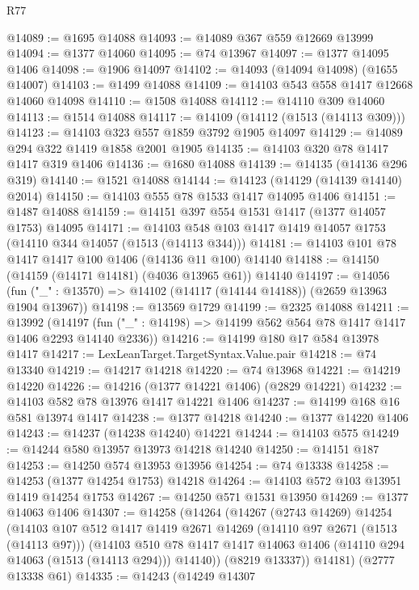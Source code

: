 \begin{lexlean}{R77}
\begin{coremodule}
{{@14089 := @1695 @14088
@14093 := @14089 @367 @559 @12669 @13999
@14094 := @1377 @14060
@14095 := @74 @13967
@14097 := @1377 @14095 @1406
@14098 := @1906 @14097
@14102 := @14093 (@14094 @14098) (@1655 @14007)
@14103 := @1499 @14088
@14109 := @14103 @543 @558 @1417 @12668 @14060 @14098
@14110 := @1508 @14088
@14112 := @14110 @309 @14060
@14113 := @1514 @14088
@14117 := @14109 (@14112 (@1513 (@14113 @309)))
@14123 := @14103 @323 @557 @1859 @3792 @1905 @14097
@14129 := @14089 @294 @322 @1419 @1858 @2001 @1905
@14135 := @14103 @320 @78 @1417 @1417 @319 @1406
@14136 := @1680 @14088
@14139 := @14135 (@14136 @296 @319)
@14140 := @1521 @14088
@14144 := @14123 (@14129 (@14139 @14140) @2014)
@14150 := @14103 @555 @78 @1533 @1417 @14095 @1406
@14151 := @1487 @14088
@14159 := @14151 @397 @554 @1531 @1417 (@1377 @14057 @1753) @14095
@14171 := @14103 @548 @103 @1417 @1419 @14057 @1753 (@14110 @344 @14057 (@1513 (@14113 @344)))
@14181 := @14103 @101 @78 @1417 @1417 @100 @1406 (@14136 @11 @100) @14140
@14188 := @14150 (@14159 (@14171 @14181) (@4036 @13965 @61)) @14140
@14197 := @14056 (fun ("_" : @13570) => @14102 (@14117 (@14144 @14188)) (@2659 @13963 @1904 @13967))
@14198 := @13569 @1729
@14199 := @2325 @14088
@14211 := @13992
    (@14197 (fun ("_" : @14198) => @14199 @562 @564 @78 @1417 @1417 @1406 @2293 @14140 @2336))
@14216 := @14199 @180 @17 @584 @13978 @1417
@14217 := LexLeanTarget.TargetSyntax.Value.pair
@14218 := @74 @13340
@14219 := @14217 @14218
@14220 := @74 @13968
@14221 := @14219 @14220
@14226 := @14216 (@1377 @14221 @1406) (@2829 @14221)
@14232 := @14103 @582 @78 @13976 @1417 @14221 @1406
@14237 := @14199 @168 @16 @581 @13974 @1417
@14238 := @1377 @14218
@14240 := @1377 @14220 @1406
@14243 := @14237 (@14238 @14240) @14221
@14244 := @14103 @575
@14249 := @14244 @580 @13957 @13973 @14218 @14240
@14250 := @14151 @187
@14253 := @14250 @574 @13953 @13956
@14254 := @74 @13338
@14258 := @14253 (@1377 @14254 @1753) @14218
@14264 := @14103 @572 @103 @13951 @1419 @14254 @1753
@14267 := @14250 @571 @1531 @13950
@14269 := @1377 @14063 @1406
@14307 := @14258
    (@14264
      (@14267
        (@2743 @14269)
        @14254
        (@14103
          @107
          @512
          @1417
          @1419
          @2671
          @14269
          (@14110 @97 @2671 (@1513 (@14113 @97)))
          (@14103
            @510
            @78
            @1417
            @1417
            @14063
            @1406
            (@14110 @294 @14063 (@1513 (@14113 @294)))
            @14140))
        (@8219 @13337))
      @14181)
    (@2777 @13338 @61)
@14335 := @14243
    (@14249
      @14307
}}
\end{coremodule}
\end{lexlean}
